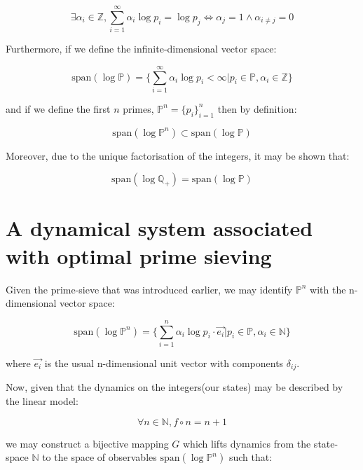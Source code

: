 \documentclass{article}
\begin{document}
\begin{equation}
\exists \alpha_i \in \mathbb{Z}, \sum_{i=1}^\infty \alpha_i \log p_i = \log p_j \iff \alpha_j = 1 \land \alpha_{i \neq j} = 0
\end{equation}

Furthermore, if we define the infinite-dimensional vector space:

\begin{equation}
\text{span}(\log \mathbb{P}) = \Big\{\sum_{i=1}^\infty \alpha_i \log p_i < \infty \lvert p_i \in \mathbb{P}, \alpha_i \in \mathbb{Z}\Big\}
\end{equation}

and if we define the first $n$ primes, $\mathbb{P}^n = \{p_i\}_{i=1}^n$ then by definition:

\begin{equation}
\text{span}(\log \mathbb{P}^n) \subset \text{span}(\log \mathbb{P})
\end{equation}

Moreover, due to the unique factorisation of the integers, it may be shown that:

\begin{equation}
\text{span}(\log \mathbb{Q}_+) = \text{span}(\log \mathbb{P})
\end{equation}

\section{A dynamical system associated with optimal prime sieving}

Given the prime-sieve that was introduced earlier, we may identify $\mathbb{P}^n$
with the n-dimensional vector space:

\begin{equation}
\text{span}(\log \mathbb{P}^n) = \Big\{\sum_{i=1}^n \alpha_i \log p_i \cdot \vec{e_i}  \lvert p_i \in \mathbb{P}, \alpha_i \in \mathbb{N}\Big\}
\end{equation}

where $\vec{e_i}$ is the usual n-dimensional unit vector with components $\delta_{ij}$.

Now, given that the dynamics on the integers(our states) may be described by the linear model:

\begin{equation}
\forall n \in \mathbb{N}, f \circ n = n+1
\end{equation}

we may construct a bijective mapping $G$ which lifts dynamics from the state-space $\mathbb{N}$ to the space of observables $\text{span}(\log \mathbb{P}^n)$ such that:
\end{document}

